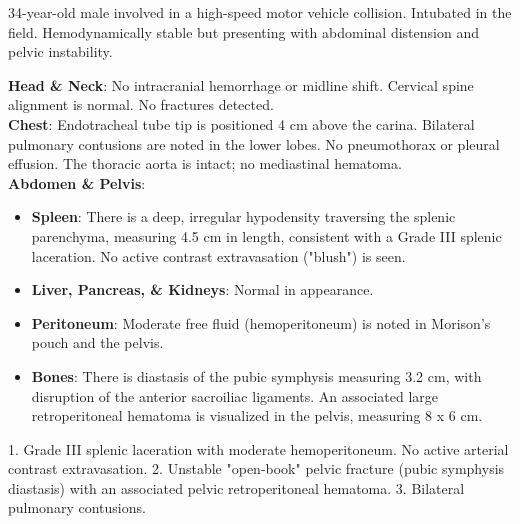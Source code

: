 \begin{testbox}[Indications:]
34-year-old male involved in a high-speed motor vehicle collision. Intubated in the field. Hemodynamically stable but presenting with abdominal distension and pelvic instability.
\end{testbox}
\begin{refbox}[Findings:]
\textbf{Head \& Neck}: No intracranial hemorrhage or midline shift. Cervical spine alignment is normal. No fractures detected.\\
\textbf{Chest}: Endotracheal tube tip is positioned 4 cm above the carina. Bilateral pulmonary contusions are noted in the lower lobes. No pneumothorax or pleural effusion. The thoracic aorta is intact; no mediastinal hematoma.\\
\textbf{Abdomen \& Pelvis}:
\begin{itemize}
    \item \textbf{Spleen}: There is a deep, irregular hypodensity traversing the splenic parenchyma, measuring 4.5 cm in length, consistent with a Grade III splenic laceration. No active contrast extravasation ("blush") is seen.
    \item \textbf{Liver, Pancreas, \& Kidneys}: Normal in appearance.
    \item \textbf{Peritoneum}: Moderate free fluid (hemoperitoneum) is noted in Morison's pouch and the pelvis.
    \item \textbf{Bones}: There is diastasis of the pubic symphysis measuring 3.2 cm, with disruption of the anterior sacroiliac ligaments. An associated large retroperitoneal hematoma is visualized in the pelvis, measuring 8 x 6 cm.
\end{itemize}
\end{refbox}
\begin{pearlbox}[Impression:]
1. Grade III splenic laceration with moderate hemoperitoneum. No active arterial contrast extravasation.
2. Unstable "open-book" pelvic fracture (pubic symphysis diastasis) with an associated pelvic retroperitoneal hematoma.
3. Bilateral pulmonary contusions.
\end{pearlbox}

\clearpage
